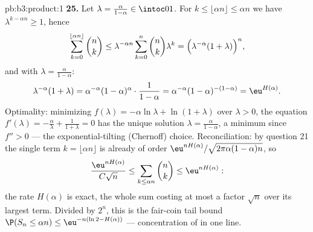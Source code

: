 \begin{solution}{pb:b3:product:1}
\textbf{25.} Let $\lambda = \frac{\alpha}{1-\alpha} \in
\intoc01$. For $k \leq \lfloor\alpha n\rfloor \leq \alpha n$
we have $\lambda^{k - \alpha n} \geq 1$, hence
\[
\sum_{k=0}^{\lfloor\alpha n\rfloor}\binom nk
\leq \lambda^{-\alpha n}\sum_{k=0}^{n}\binom nk\lambda^{k}
= \Bigl(\lambda^{-\alpha}(1 + \lambda)\Bigr)^{n},
\]
and with $\lambda = \frac\alpha{1-\alpha}$:
\[
\lambda^{-\alpha}(1+\lambda)
= \alpha^{-\alpha}(1-\alpha)^{\alpha}\cdot\frac1{1-\alpha}
= \alpha^{-\alpha}(1-\alpha)^{-(1-\alpha)}
= \eu^{H(\alpha)} .
\]
Optimality: minimizing $f(\lambda) = -\alpha\ln\lambda +
\ln(1+\lambda)$ over $\lambda > 0$, the equation $f'(\lambda)
= -\frac\alpha\lambda + \frac1{1+\lambda} = 0$ has the unique
solution $\lambda = \frac\alpha{1-\alpha}$, a minimum since
$f'' > 0$ --- the exponential-tilting (Chernoff) choice.
Reconciliation: by question 21 the single term $k =
\lfloor\alpha n\rfloor$ is already of order
$\eu^{nH(\alpha)}/\sqrt{2\pi\alpha(1-\alpha)n}$, so
\[
\frac{\eu^{nH(\alpha)}}{C\sqrt n} \leq
\sum_{k\leq\alpha n}\binom nk \leq \eu^{nH(\alpha)} :
\]
the rate $H(\alpha)$ is exact, the whole sum costing at most
a factor $\sqrt n$ over its largest term. Divided by $2^n$,
this is the fair-coin tail bound $\P(S_n \leq \alpha n) \leq
\eu^{-n(\ln2 - H(\alpha))}$ --- concentration of  in
one line.
\end{solution}
